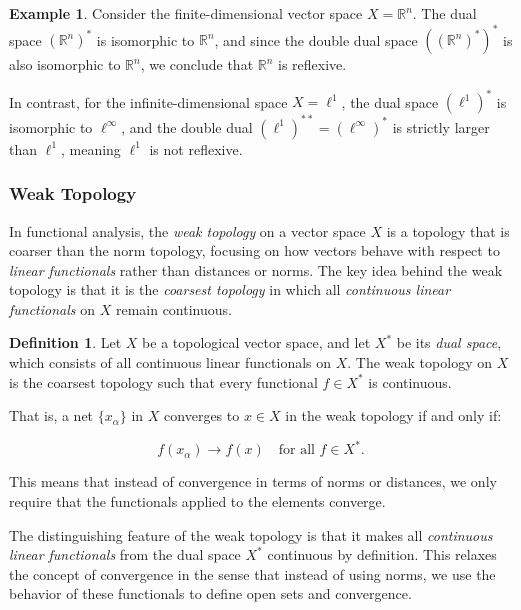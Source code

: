 \documentclass[12pt, reqno]{amsart}
\theoremstyle{definition}
\newtheorem{definition}[theorem]{Definition}
\newtheorem{example}[theorem]{Example}
\numberwithin{equation}{section}
\newcommand{\dR}{{\mathbb R}}
\begin{document}
\begin{example}
    Consider the finite-dimensional vector space $X = \dR^n$. The dual space $(\dR^n)^*$ is isomorphic to $\dR^n$, and since the double dual space $((\dR^n)^*)^*$ is also isomorphic to $\dR^n$, we conclude that $\dR^n$ is reflexive. 

In contrast, for the infinite-dimensional space $X = \ell^1$, the dual space $(\ell^1)^*$ is isomorphic to $\ell^\infty$, and the double dual $(\ell^1)^{**} = (\ell^\infty)^*$ is strictly larger than $\ell^1$, meaning $\ell^1$ is not reflexive.
\end{example}

\subsubsection{Weak Topology}
In functional analysis, the \textit{weak topology} on a vector space $X$ is a topology that is coarser than the norm topology, focusing on how vectors behave with respect to \textit{linear functionals} rather than distances or norms. The key idea behind the weak topology is that it is the \textit{coarsest topology} in which all \textit{continuous linear functionals} on $X$ remain continuous.

\begin{definition}
    Let $X$ be a topological vector space, and let $X^*$ be its \textit{dual space}, which consists of all continuous linear functionals on $X$. The weak topology on $X$ is the coarsest topology such that every functional $f \in X^*$ is continuous.

That is, a net $\{x_\alpha\}$ in $X$ converges to $x \in X$ in the weak topology if and only if:

\[
f(x_\alpha) \to f(x) \quad \text{for all } f \in X^*.
\]

This means that instead of convergence in terms of norms or distances, we only require that the functionals applied to the elements converge.
\end{definition}


The distinguishing feature of the weak topology is that it makes all \textit{continuous linear functionals} from the dual space $X^*$ continuous by definition. This relaxes the concept of convergence in the sense that instead of using norms, we use the behavior of these functionals to define open sets and convergence.
\end{document}
